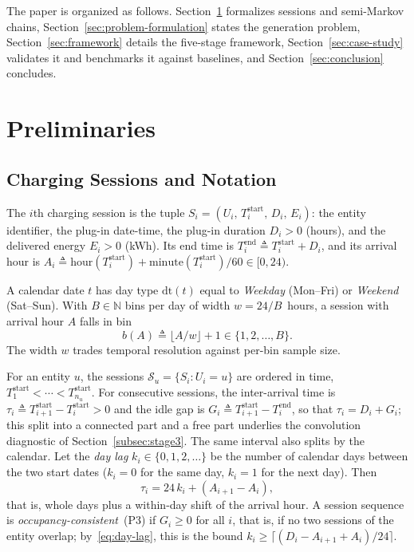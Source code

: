 \documentclass[journal]{IEEEtran}
\begin{document}
The paper is organized as follows. Section~\ref{sec:preliminaries} formalizes sessions and semi-Markov chains, Section~\ref{sec:problem-formulation} states the generation problem, Section~\ref{sec:framework} details the five-stage framework, Section~\ref{sec:case-study} validates it and benchmarks it against baselines, and Section~\ref{sec:conclusion} concludes.

\section{Preliminaries}
\label{sec:preliminaries}
\subsection{Charging Sessions and Notation}
\label{subsec:session-random-object}
The $i$th charging session is the tuple $S_i = (U_i,\, T_i^{\mathrm{start}},\, D_i,\, E_i)$: the entity identifier, the plug-in date-time, the plug-in duration $D_i > 0$ (hours), and the delivered energy $E_i > 0$ (kWh). Its end time is $T_i^{\mathrm{end}} \triangleq T_i^{\mathrm{start}} + D_i$, and its arrival hour is $A_i \triangleq \mathrm{hour}(T_i^{\mathrm{start}}) + \mathrm{minute}(T_i^{\mathrm{start}})/60 \in [0, 24)$.

A calendar date $t$ has day type $\mathrm{dt}(t)$ equal to \emph{Weekday} (Mon--Fri) or \emph{Weekend} (Sat--Sun). With $B \in \mathbb{N}$ bins per day of width $w = 24/B$~hours, a session with arrival hour $A$ falls in bin
\begin{equation}
    b(A) \triangleq \lfloor A/w \rfloor + 1 \in \{1, 2, \ldots, B\}.
    \label{eq:bin-index}
\end{equation}
The width $w$ trades temporal resolution against per-bin sample size.

For an entity $u$, the sessions $\mathcal{S}_u = \{S_i : U_i = u\}$ are ordered in time, $T_1^{\mathrm{start}} < \cdots < T_{n_u}^{\mathrm{start}}$. For consecutive sessions, the inter-arrival time is $\tau_i \triangleq T_{i+1}^{\mathrm{start}} - T_i^{\mathrm{start}} > 0$ and the idle gap is $G_i \triangleq T_{i+1}^{\mathrm{start}} - T_i^{\mathrm{end}}$, so that $\tau_i = D_i + G_i$; this split into a connected part and a free part underlies the convolution diagnostic of Section~\ref{subsec:stage3}. The same interval also splits by the calendar. Let the \emph{day lag} $k_i \in \{0, 1, 2, \ldots\}$ be the number of calendar days between the two start dates ($k_i = 0$ for the same day, $k_i = 1$ for the next day). Then
\begin{equation}
    \tau_i = 24\,k_i + (A_{i+1} - A_i),
    \label{eq:day-lag}
\end{equation}
that is, whole days plus a within-day shift of the arrival hour. A session sequence is \emph{occupancy-consistent}~(P3) if $G_i \geq 0$ for all $i$, that is, if no two sessions of the entity overlap; by~\eqref{eq:day-lag}, this is the bound $k_i \geq \lceil (D_i - A_{i+1} + A_i)/24 \rceil$.
\end{document}
